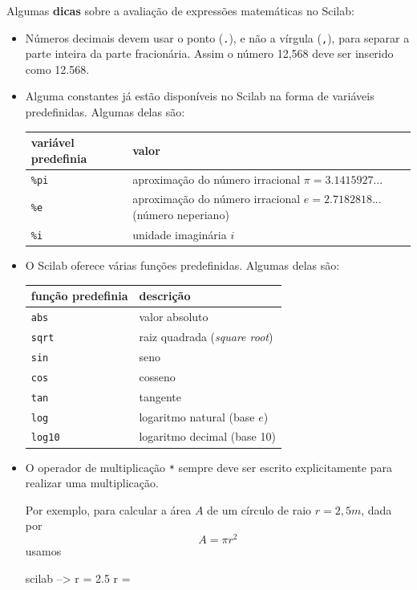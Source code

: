 \documentclass[11pt,fleqn]{practice}
\begin{document}
Algumas \textbf{dicas} sobre a avaliação de expressões matemáticas no
Scilab:
\begin{itemize}
  \item Números decimais devem usar o ponto (\texttt{.}), e não a
  vírgula (\texttt{,}), para separar a parte inteira da parte
  fracionária. Assim o número 12,568 deve ser inserido como 12.568.

  \item Alguma constantes já estão disponíveis no Scilab na forma de
  variáveis predefinidas. Algumas delas são:

  \begin{tabularx}{\linewidth}{|l|X|}\hline
    \textbf{variável predefinia} & \textbf{valor} \\\hline
    \texttt{\%pi} & aproximação do número irracional $\pi = 3.1415927...$ \\\hline
    \texttt{\%e}  & aproximação do número irracional $e = 2.7182818...$\newline (número neperiano) \\\hline
    \texttt{\%i}  & unidade imaginária $i$ \\\hline
  \end{tabularx}

  \item O Scilab oferece várias funções predefinidas. Algumas delas são:

  \begin{tabular}{|l|l|}\hline
    \textbf{função predefinia} & \textbf{descrição} \\\hline
    \texttt{abs}   & valor absoluto \\\hline
    \texttt{sqrt}  & raiz quadrada (\emph{square root}) \\\hline
    \texttt{sin}   & seno \\\hline
    \texttt{cos}   & cosseno \\\hline
    \texttt{tan}   & tangente \\\hline
    \texttt{log}   & logaritmo natural (base $e$) \\\hline
    \texttt{log10} & logaritmo decimal (base 10) \\\hline
  \end{tabular}

  \item O operador de multiplicação \texttt{*} sempre deve ser escrito
  explicitamente para realizar uma multiplicação.

  Por exemplo, para calcular a área $A$ de um círculo de raio $r =
  2,5m$, dada por \[ A = \pi r^2 \] usamos
  \begin{lst}{scilab}
--> r = 2.5
 r  =
 

\end{lst}
\end{itemize}
\end{document}
